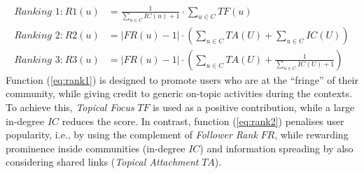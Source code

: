 \begin{align}
\textit{Ranking 1:} ~ \mathit{R1}(u) & = \frac{1}{\sum_{u \in C} \mathit{IC}(u) + 1} \cdot \sum_{u \in C} \mathit{TF}(u) \label{eq:rank1} \\
\textit{Ranking 2:} ~ \mathit{R2}(u) & = \lvert \mathit{FR}(u) - 1 \rvert \cdot \left(\sum_{u \in C} \mathit{TA}(U) + \sum_{u \in C} \mathit{IC}(U)\right) \label{eq:rank2} \\
\textit{Ranking 3:} ~ \mathit{R3}(u) & = \lvert \mathit{FR}(u) - 1 \rvert \cdot \left(\sum_{u \in C} \mathit{TA}(U) + \frac{1}{\sum_{u \in C} \mathit{IC}(U) + 1}\right) \label{eq:rank3}
\end{align}
%
Function (\ref{eq:rank1}) is designed to promote users who are at the ``fringe'' of their community, while giving credit to generic on-topic activities during the contexts. 
To achieve this, \textit{Topical Focus} $\mathit{TF}$ is used as a positive contribution, while a large in-degree $\mathit{IC}$ reduces the score.
%
In contrast, function (\ref{eq:rank2}) penalises user popularity, i.e., by using the complement of \textit{Follower Rank} $\mathit{FR}$, while rewarding prominence inside communities (in-degree $\mathit{IC}$) and information spreading by also considering shared links (\textit{Topical Attachment} $\mathit{TA}$).

